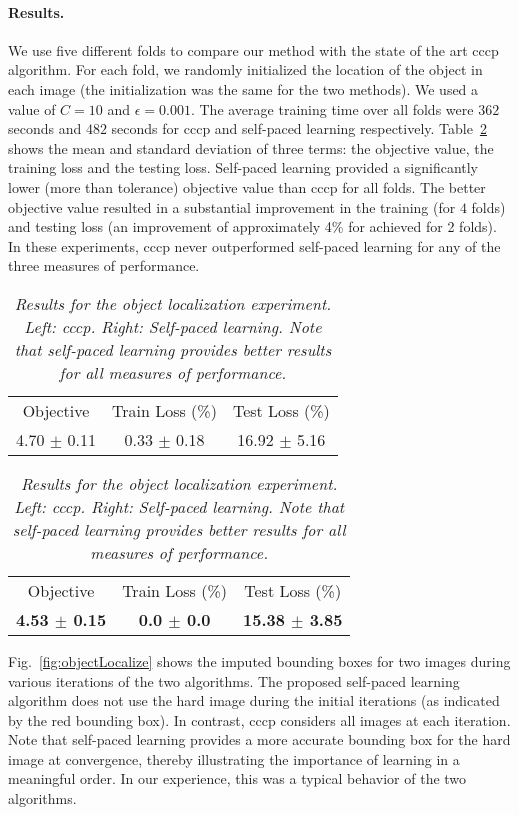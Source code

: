 \documentclass{article}
\newcommand{\myparagraph}[1]{\vspace{-2mm}\paragraph{#1}}
\newcommand{\mycaption}[1]{\vspace{-3mm}\caption{\em \footnotesize #1}\vspace{-3mm}}
\begin{document}
\myparagraph{Results.} We use five different folds to compare our method with the state of the art
{\sc cccp} algorithm. For each fold, we randomly initialized the location of the object in each image (the
initialization was the same for the two methods). We used a value of $C = 10$ and $\epsilon = 0.001$.
The average training time over all folds were $362$ seconds and
$482$ seconds for {\sc cccp} and self-paced learning respectively. Table~\ref{table:objectLocalize} shows the
mean and standard deviation of three terms: the objective value, the training loss and the testing loss.
Self-paced learning provided a significantly lower (more than tolerance) objective value
than {\sc cccp} for all folds. The better objective value resulted in a substantial improvement in the training
(for $4$ folds) and testing loss (an improvement of approximately 4\%
for achieved for 2 folds). In these experiments, {\sc cccp} never
outperformed self-paced learning for any of the three measures of
performance. 
\begin{table}[h!]
\small
\begin{center}
\begin{tabular}{|c|c|c|}
\hline
Objective & Train Loss (\%) & Test Loss (\%) \\
4.70 $\pm$ 0.11 & 0.33 $\pm$ 0.18  & 16.92 $\pm$ 5.16 \\
\hline
\end{tabular} 
\begin{tabular}{|c|c|c|}
\hline
Objective & Train Loss (\%) & Test Loss (\%) \\
{\bf 4.53 $\pm$ 0.15} & {\bf 0.0 $\pm$ 0.0}  & {\bf 15.38 $\pm$ 3.85} \\
\hline
\end{tabular} 
\end{center}
\mycaption{\it Results for the object localization experiment. Left: {\sc cccp}. Right: Self-paced learning. Note that
self-paced learning provides better results for all measures of performance.}
\label{table:objectLocalize}
\end{table}

Fig.~\ref{fig:objectLocalize} shows the imputed bounding boxes for two images during various iterations of the
two algorithms. The proposed self-paced learning algorithm does not use the hard image during the
initial iterations (as indicated by the red bounding box). In contrast, {\sc cccp} considers all images at
each iteration. Note that self-paced learning provides a more accurate bounding box for the hard image at
convergence, thereby illustrating the importance of learning in a meaningful order.
In our experience, this was a typical behavior of the two algorithms.
\end{document}
